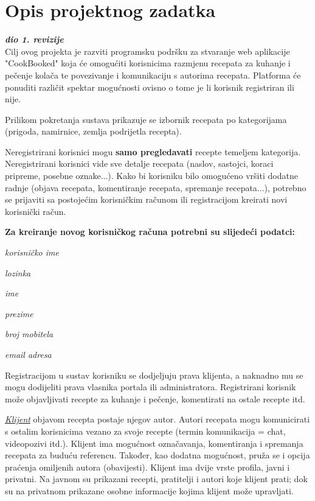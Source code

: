 \chapter{Opis projektnog zadatka}
		
		\textbf{\textit{dio 1. revizije}}\\
		
		Cilj ovog projekta je razviti programsku podršku za stvaranje web aplikacije "CookBooked" koja će
		omogućiti korisnicima razmjenu recepata za kuhanje i pečenje kolača te povezivanje i komunikaciju s autorima
		recepata. Platforma će ponuditi različit spektar mogućnosti ovisno o tome je li korisnik registriran ili nije.

		Prilikom pokretanja sustava prikazuje se izbornik recepata po kategorijama (prigoda, namirnice, zemlja podrijetla recepta).		
		
		Neregistrirani korisnici mogu \textbf{samo pregledavati} recepte temeljem kategorija.
		Neregistrirani korisnici vide sve detalje recepata (naslov, sastojci, koraci pripreme, posebne oznake...).
		Kako bi korisniku bilo omogućeno vršiti dodatne radnje (objava recepata, komentiranje recepata, spremanje recepata...),
		potrebno se prijaviti sa postojećim korisničkim računom ili registracijom kreirati novi korisnički račun.

		\textbf{
			Za kreiranje novog korisničkog računa potrebni su slijedeći podatci:
		}
		\begin{packed_item}
			\item \textit{korisničko ime}
			\item \textit{lozinka}
			\item \textit{ime}
			\item \textit{prezime}
			\item \textit{broj mobitela}
			\item \textit{email adresa}
		\end{packed_item}

		Registracijom u sustav korisniku se dodjeljuju prava klijenta, a naknadno mu se mogu dodijeliti prava
		vlasnika portala ili administratora. Registrirani korisnik može objavljivati recepte za kuhanje i pečenje,
		komentirati na ostale recepte itd.
				
		\underline{\textit{Klijent}} objavom recepta postaje njegov autor. Autori recepata mogu komunicirati s ostalim
		korisnicima vezano za svoje recepte (termin komunikacija = chat, videopozivi itd.). Klijent ima mogućnost označavanja, 
		komentiranja i spremanja recepata za buduću referencu. Također, kao dodatna mogućnost, pruža se i opcija praćenja 
		omiljenih autora (obavijesti). Klijent ima dvije vrste profila, javni i privatni. Na javnom su prikazani recepti,
		pratitelji i autori koje klijent prati; dok su na privatnom prikazane osobne informacije kojima klijent može
		upravljati.
		
